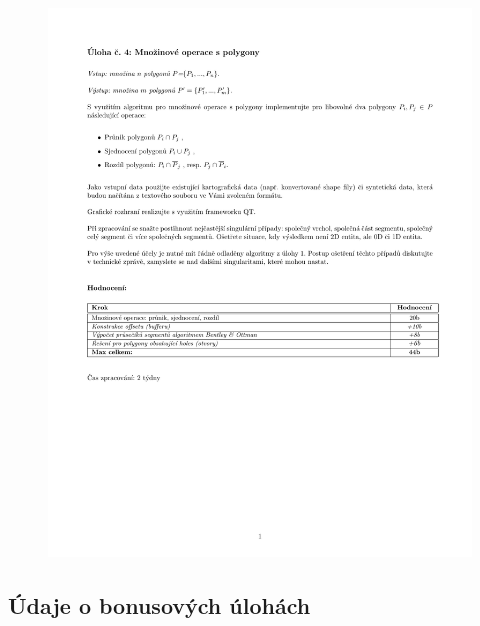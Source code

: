 \documentclass[a4paper, 12pt]{article}
\begin{document}
\begin{figure}[h!]
	\centering
	\includegraphics[width=17cm]{zadani.pdf}
\end{figure}

\subsection{Údaje o bonusových úlohách}
\end{document}
